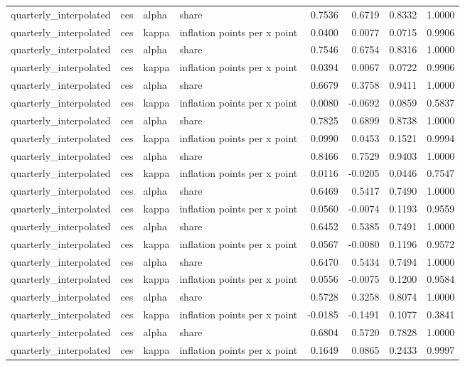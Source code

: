 \begin{tabular}{llllrrrr}
quarterly\_interpolated & ces & alpha & share & 0.7536 & 0.6719 & 0.8332 & 1.0000 \\
quarterly\_interpolated & ces & kappa & inflation points per x point & 0.0400 & 0.0077 & 0.0715 & 0.9906 \\
quarterly\_interpolated & ces & alpha & share & 0.7546 & 0.6754 & 0.8316 & 1.0000 \\
quarterly\_interpolated & ces & kappa & inflation points per x point & 0.0394 & 0.0067 & 0.0722 & 0.9906 \\
quarterly\_interpolated & ces & alpha & share & 0.6679 & 0.3758 & 0.9411 & 1.0000 \\
quarterly\_interpolated & ces & kappa & inflation points per x point & 0.0080 & -0.0692 & 0.0859 & 0.5837 \\
quarterly\_interpolated & ces & alpha & share & 0.7825 & 0.6899 & 0.8738 & 1.0000 \\
quarterly\_interpolated & ces & kappa & inflation points per x point & 0.0990 & 0.0453 & 0.1521 & 0.9994 \\
quarterly\_interpolated & ces & alpha & share & 0.8466 & 0.7529 & 0.9403 & 1.0000 \\
quarterly\_interpolated & ces & kappa & inflation points per x point & 0.0116 & -0.0205 & 0.0446 & 0.7547 \\
quarterly\_interpolated & ces & alpha & share & 0.6469 & 0.5417 & 0.7490 & 1.0000 \\
quarterly\_interpolated & ces & kappa & inflation points per x point & 0.0560 & -0.0074 & 0.1193 & 0.9559 \\
quarterly\_interpolated & ces & alpha & share & 0.6452 & 0.5385 & 0.7491 & 1.0000 \\
quarterly\_interpolated & ces & kappa & inflation points per x point & 0.0567 & -0.0080 & 0.1196 & 0.9572 \\
quarterly\_interpolated & ces & alpha & share & 0.6470 & 0.5434 & 0.7494 & 1.0000 \\
quarterly\_interpolated & ces & kappa & inflation points per x point & 0.0556 & -0.0075 & 0.1200 & 0.9584 \\
quarterly\_interpolated & ces & alpha & share & 0.5728 & 0.3258 & 0.8074 & 1.0000 \\
quarterly\_interpolated & ces & kappa & inflation points per x point & -0.0185 & -0.1491 & 0.1077 & 0.3841 \\
quarterly\_interpolated & ces & alpha & share & 0.6804 & 0.5720 & 0.7828 & 1.0000 \\
quarterly\_interpolated & ces & kappa & inflation points per x point & 0.1649 & 0.0865 & 0.2433 & 0.9997 \\

\end{tabular}
